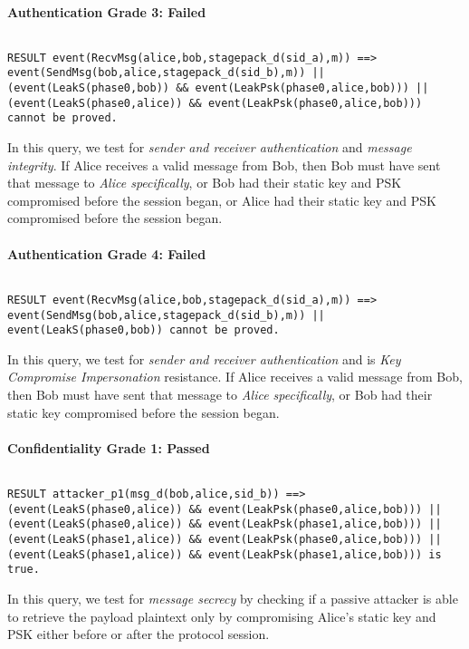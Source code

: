 \paragraph{Authentication Grade 3: Failed}$ $
\begin{lstlisting}
RESULT event(RecvMsg(alice,bob,stagepack_d(sid_a),m)) ==> event(SendMsg(bob,alice,stagepack_d(sid_b),m)) || (event(LeakS(phase0,bob)) && event(LeakPsk(phase0,alice,bob))) || (event(LeakS(phase0,alice)) && event(LeakPsk(phase0,alice,bob))) cannot be proved.
\end{lstlisting}

In this query, we test for \emph{sender and receiver authentication} and \emph{message integrity}. If Alice receives a valid message from Bob, then Bob must have sent that message to \emph{Alice specifically}, or Bob had their static key and PSK compromised before the session began, or Alice had their static key and PSK compromised before the session began.


\paragraph{Authentication Grade 4: Failed}$ $
\begin{lstlisting}
RESULT event(RecvMsg(alice,bob,stagepack_d(sid_a),m)) ==> event(SendMsg(bob,alice,stagepack_d(sid_b),m)) || event(LeakS(phase0,bob)) cannot be proved.
\end{lstlisting}

In this query, we test for \emph{sender and receiver authentication} and is \emph{Key Compromise Impersonation} resistance. If Alice receives a valid message from Bob, then Bob must have sent that message to \emph{Alice specifically}, or Bob had their static key compromised before the session began.


\paragraph{Confidentiality Grade 1: Passed}$ $
\begin{lstlisting}
RESULT attacker_p1(msg_d(bob,alice,sid_b)) ==> (event(LeakS(phase0,alice)) && event(LeakPsk(phase0,alice,bob))) || (event(LeakS(phase0,alice)) && event(LeakPsk(phase1,alice,bob))) || (event(LeakS(phase1,alice)) && event(LeakPsk(phase0,alice,bob))) || (event(LeakS(phase1,alice)) && event(LeakPsk(phase1,alice,bob))) is true.
\end{lstlisting}

In this query, we test for \emph{message secrecy} by checking if a passive attacker is able to retrieve the payload plaintext only by compromising Alice's static key and PSK either before or after the protocol session.


